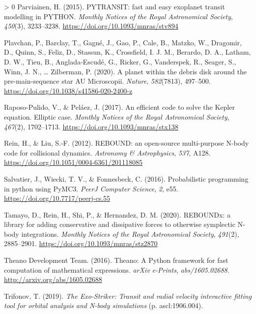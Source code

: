 \documentclass[10pt,a4paper,onecolumn]{article}
\newlength{\cslhangindent}
\newenvironment{CSLReferences}[3] %
 {%
  \setlength{\parindent}{0pt}
  \ifodd #1 \everypar{\setlength{\hangindent}{\cslhangindent}}\ignorespaces\fi
  \ifnum #2 > 0
  \setlength{\parskip}{#2\baselineskip}
  \fi
 }%
 {}
\begin{document}
\begin{CSLReferences}{1}{0}
\leavevmode\hypertarget{ref-parviainen15}{}%
Parviainen, H. (2015). {PYTRANSIT: fast and easy exoplanet transit
modelling in PYTHON}. \emph{Monthly Notices of the Royal Astronomical
Society}, \emph{450}(3), 3233--3238.
\url{https://doi.org/10.1093/mnras/stv894}

\leavevmode\hypertarget{ref-plavchan20}{}%
Plavchan, P., Barclay, T., Gagné, J., Gao, P., Cale, B., Matzko, W.,
Dragomir, D., Quinn, S., Feliz, D., Stassun, K., Crossfield, I. J. M.,
Berardo, D. A., Latham, D. W., Tieu, B., Anglada-Escudé, G., Ricker, G.,
Vanderspek, R., Seager, S., Winn, J. N., \ldots{} Zilberman, P. (2020).
{A planet within the debris disk around the pre-main-sequence star AU
Microscopii}. \emph{Nature}, \emph{582}(7813), 497--500.
\url{https://doi.org/10.1038/s41586-020-2400-z}

\leavevmode\hypertarget{ref-raposo17}{}%
Raposo-Pulido, V., \& Peláez, J. (2017). {An efficient code to solve the
Kepler equation. Elliptic case}. \emph{Monthly Notices of the Royal
Astronomical Society}, \emph{467}(2), 1702--1713.
\url{https://doi.org/10.1093/mnras/stx138}

\leavevmode\hypertarget{ref-rein12}{}%
Rein, H., \& Liu, S.-F. (2012). {REBOUND: an open-source multi-purpose
N-body code for collisional dynamics}. \emph{Astronomy \& Astrophysics},
\emph{537}, A128. \url{https://doi.org/10.1051/0004-6361/201118085}

\leavevmode\hypertarget{ref-pymc3}{}%
Salvatier, J., Wiecki, T. V., \& Fonnesbeck, C. (2016). Probabilistic
programming in python using PyMC3. \emph{PeerJ Computer Science},
\emph{2}, e55. \url{https://doi.org/10.7717/peerj-cs.55}

\leavevmode\hypertarget{ref-tamayo20}{}%
Tamayo, D., Rein, H., Shi, P., \& Hernandez, D. M. (2020). {REBOUNDx: a
library for adding conservative and dissipative forces to otherwise
symplectic N-body integrations}. \emph{Monthly Notices of the Royal
Astronomical Society}, \emph{491}(2), 2885--2901.
\url{https://doi.org/10.1093/mnras/stz2870}

\leavevmode\hypertarget{ref-theano}{}%
Theano Development Team. (2016). {Theano: A {Python} framework for fast
computation of mathematical expressions}. \emph{arXiv e-Prints},
\emph{abs/1605.02688}. \url{http://arxiv.org/abs/1605.02688}

\leavevmode\hypertarget{ref-trifonov19}{}%
Trifonov, T. (2019). \emph{{The Exo-Striker: Transit and radial velocity
interactive fitting tool for orbital analysis and N-body simulations}}
(p. ascl:1906.004).


\end{CSLReferences}
\end{document}
